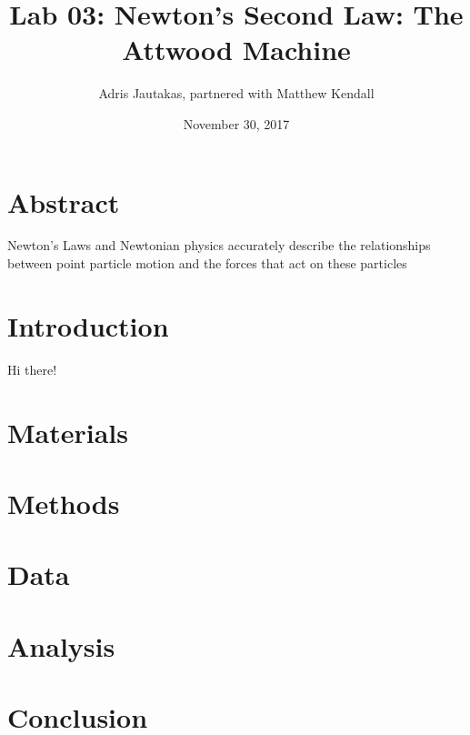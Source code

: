\documentclass[12pt]{article}
\title{Lab 03: Newton's Second Law: The Attwood Machine}
\author{Adris Jautakas, partnered with Matthew Kendall}
\date{November 30, 2017}
\begin{document}
   \maketitle

    \section*{Abstract}
        {\small 
            Newton's Laws and Newtonian physics accurately describe the 
            relationships between point particle motion and the forces
            that act on these particles
        }
    \section{Introduction}
    Hi there!
    \section{Materials}


    \section{Methods}

    \section{Data}

    \section{Analysis}

    \section{Conclusion}
\end{document}
